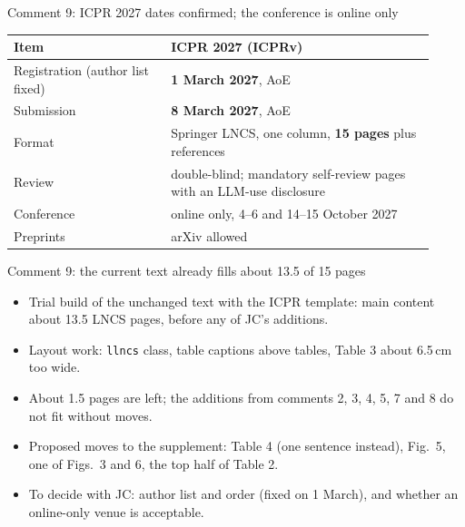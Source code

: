 
\begin{frame}{Comment 9: ICPR 2027 dates confirmed; the conference is online only}
\begin{slidetable}
\begin{tabular}{@{}>{\raggedright\arraybackslash}p{0.34\linewidth}>{\raggedright\arraybackslash}p{0.58\linewidth}@{}}
\toprule
Item & ICPR 2027 (ICPRv) \\
\midrule
Registration (author list fixed) & \textbf{1 March 2027}, AoE \\
Submission & \textbf{8 March 2027}, AoE \\
Format & Springer LNCS, one column, \textbf{15 pages} plus references \\
Review & double-blind; mandatory self-review pages with an LLM-use disclosure \\
Conference & online only, 4--6 and 14--15 October 2027 \\
Preprints & arXiv allowed \\
\bottomrule
\end{tabular}
\end{slidetable}
\end{frame}

\begin{frame}{Comment 9: the current text already fills about 13.5 of 15 pages}
\begin{itemize}
\item Trial build of the unchanged text with the ICPR template: main content about 13.5 LNCS pages, before any of JC's additions.
\item Layout work: \texttt{llncs} class, table captions above tables, Table 3 about 6.5\,cm too wide.
\item About 1.5 pages are left; the additions from comments 2, 3, 4, 5, 7 and 8 do not fit without moves.
\item Proposed moves to the supplement: Table 4 (one sentence instead), Fig.~5, one of Figs.~3 and 6, the top half of Table 2.
\item To decide with JC: author list and order (fixed on 1 March), and whether an online-only venue is acceptable.
\end{itemize}
\end{frame}
